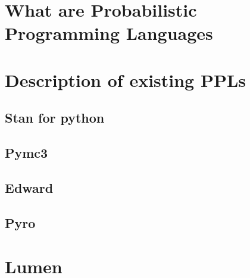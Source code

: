 \documentclass{article}
\begin{document}
\section{What are Probabilistic Programming Languages}

\section{Description of existing PPLs}

\subsection{Stan for python}

\subsection{Pymc3}

\subsection{Edward}

\subsection{Pyro}


\section{Lumen}
        
\end{document}
